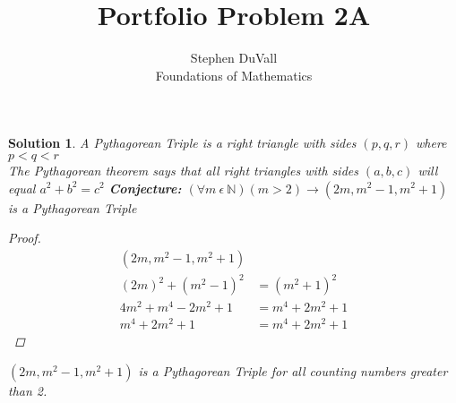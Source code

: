 \documentclass[12pt]{article}
\theoremstyle{mysolutionstyle}
\newtheorem*{soln}{Solution}
\begin{document}
\title{Portfolio Problem 2A}%
\author{Stephen DuVall \\ %
Foundations of Mathematics} %

\maketitle
\begin{soln} A Pythagorean Triple is a right triangle with sides $(p, q, r)$ where $p < q < r$\\
The Pythagorean theorem says that all right triangles with sides $(a, b, c)$ will equal $a^2 + b^2 = c^2$
\hfill
\textbf{Conjecture:} $(\forall m\ \epsilon\ \mathbb{N})(m > 2) \rightarrow (2m, m^2-1, m^2+1)$ is a Pythagorean Triple
\begin{proof}
\begin{align*}
    (2m, m^2-1, m^2+1) \\
    (2m)^2 + (m^2 - 1)^2 &= (m^2 + 1)^2 \\
    4m^2 + m^4 - 2m^2 + 1 &= m^4 + 2m^2 + 1 \\
    m^4 + 2m^2 + 1 &= m^4 + 2m^2 + 1
\end{align*}
\end{proof}
$(2m, m^2 - 1, m^2 + 1)$ is a Pythagorean Triple for all counting numbers greater than 2.
\end{soln}
\end{document}
